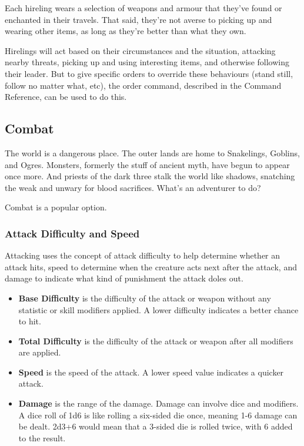 Each hireling wears a selection of weapons and armour that they've found or
enchanted in their travels.  That said, they're not averse to picking up and
wearing other items, as long as they're better than what they own.

Hirelings will act based on their circumstances and the situation, attacking
nearby threats, picking up and using interesting items, and otherwise following
their leader.  But to give specific orders to override these behaviours (stand
still, follow no matter what, etc), the order command, described in the 
Command Reference, can be used to do this.

\subsection{Combat}

The world is a dangerous place.  The outer lands are home to Snakelings,
Goblins, and Ogres.  Monsters, formerly the stuff of ancient myth, have
begun to appear once more.  And priests of the dark three stalk the world
like shadows, snatching the weak and unwary for blood sacrifices.  What's
an adventurer to do?

Combat is a popular option.

\subsubsection{Attack Difficulty and Speed}

Attacking uses the concept of attack difficulty to help determine whether
an attack hits, speed to determine when the creature acts next after the 
attack, and damage to indicate what kind of punishment the attack doles out.

\begin{itemize}
\item {\bf Base Difficulty} is the difficulty of the attack or weapon
without any statistic or skill modifiers applied.  A lower difficulty
indicates a better chance to hit.
\item {\bf Total Difficulty} is the difficulty of the attack or weapon
after all modifiers are applied.
\item {\bf Speed} is the speed of the attack.  A lower speed value
indicates a quicker attack.
\item {\bf Damage} is the range of the damage.  Damage can involve dice
and modifiers.  A dice roll of 1d6 is like rolling a six-sided die once,
meaning 1-6 damage can be dealt.  2d3+6 would mean that a 3-sided die
is rolled twice, with 6 added to the result.
\end{itemize}

